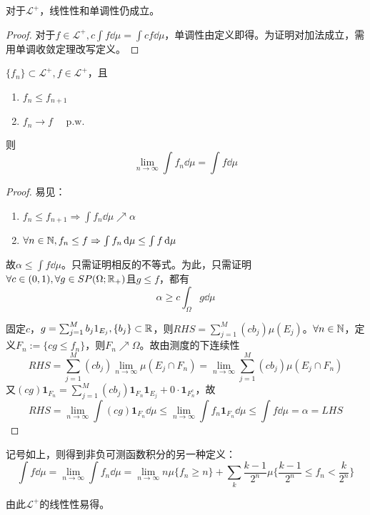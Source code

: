 \documentclass{ctexart}
\begin{document}
\begin{Prop}
  对于$\mathcal{L}^{+}$，线性性和单调性仍成立。
\end{Prop}
\begin{proof}
对于$f\in \mathcal{L}^{+},c\int f\dd\mu=\int cf\dd\mu$，单调性由定义即得。为证明对加法成立，需用单调收敛定理改写定义。
\end{proof}
\begin{Thm}
  $\{f_{n}\}\subset \mathcal L^{+},f\in\mathcal{L}^{+}$，且
  \begin{enumerate}
  \item $f_{n}\leq f_{n+1}$
  \item $f_{n}\to f\quad \text{ p.w. }$ 
  \end{enumerate}
  则
  \[\lim_{n\to\infty}\int f_{n}\dd\mu=\int f\dd\mu\]
\end{Thm}
\begin{proof}
  易见：
  \begin{enumerate}
  \item $f_{n}\leq f_{n+1}\Rightarrow \int f_{n}\dd\mu\nearrow\alpha$
  \item $\forall n\in\mathbb{N}, f_{n}\leq f\Rightarrow \int f_{n}\,\mathrm{d}\mu\leq \int f\,\mathrm{d}\mu$
  \end{enumerate}
  故$\alpha\leq\int f\dd\mu$。只需证明相反的不等式。为此，只需证明$\forall c\in (0,1),\forall g\in SP(\Omega;\mathbb{R}_{+})$且$g\leq f$，都有
  \[\alpha\geq c\int_{\Omega}g\dd\mu\]

  固定$c$，$g=\sum_{j=1}^{M}b_{j}1_{E_{j}},\{b_{j}\}\subset\mathbb{R}$，则$RHS=\sum_{j=1}^{M}(cb_{j})\mu(E_{j})$。$\forall n\in\mathbb{N}$，定义$F_{n}:=\{cg\leq f_{n}\}$，则$F_{n}\nearrow \Omega$。故由测度的下连续性
  \[RHS=\sum_{j=1}^{M}(cb_{j})\lim_{n\to\infty}\mu(E_{j}\cap F_{n})=\lim_{n\to\infty}\sum_{j=1}^{M}(cb_{j})\mu(E_{j}\cap F_{n})\]
  又$(cg)\bm 1_{F_{n}}=\sum_{j=1}^{M}(cb_{j})\bm 1_{F_{n}}\bm 1_{E_{j}}+ 0\cdot\bm 1_{F_{n}^{c}}$，故
  \[RHS=\lim\limits_{n\to\infty}\int (cg)\bm 1_{F_{n}}\dd\mu\leq \lim\limits_{n\to\infty}\int f_{n}\bm 1_{F_{n}}\dd\mu\leq \int f\dd\mu=\alpha=LHS\]
\end{proof}

\begin{Cor}
  记号如上，则得到非负可测函数积分的另一种定义：
  \[\int f\dd\mu=\lim_{n\to\infty}\int f_{n}\dd\mu=\lim_{n\to\infty}n\mu\{f_{n}\geq n\}+\sum_{k}\frac{k-1}{2^{n}}\mu\{\frac{k-1}{2^{n}}\leq f_{n}<\frac{k}{2^{n}}\}\]
\end{Cor}

由此$\mathcal{L}^{+}$的线性性易得。
\end{document}
